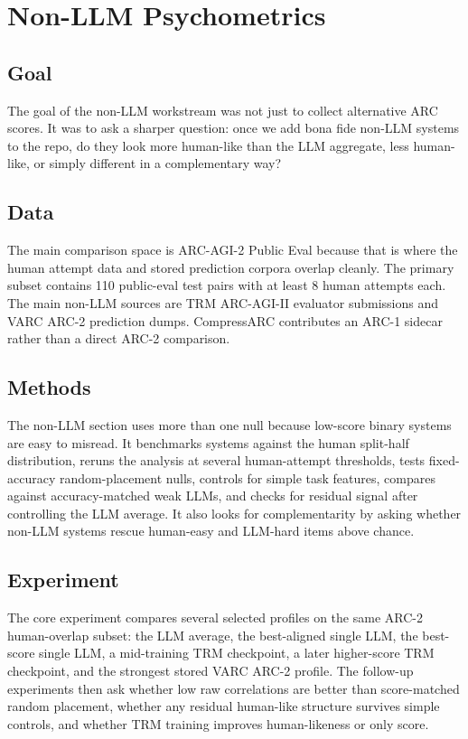 \section{Non-LLM Psychometrics}

\subsection{Goal}

The goal of the non-LLM workstream was not just to collect alternative ARC scores. It was to ask a sharper question: once we add bona fide non-LLM systems to the repo, do they look more human-like than the LLM aggregate, less human-like, or simply different in a complementary way?

\subsection{Data}

The main comparison space is ARC-AGI-2 Public Eval because that is where the human attempt data and stored prediction corpora overlap cleanly. The primary subset contains 110 public-eval test pairs with at least 8 human attempts each. The main non-LLM sources are TRM ARC-AGI-II evaluator submissions and VARC ARC-2 prediction dumps. CompressARC contributes an ARC-1 sidecar rather than a direct ARC-2 comparison.

\subsection{Methods}

The non-LLM section uses more than one null because low-score binary systems are easy to misread. It benchmarks systems against the human split-half distribution, reruns the analysis at several human-attempt thresholds, tests fixed-accuracy random-placement nulls, controls for simple task features, compares against accuracy-matched weak LLMs, and checks for residual signal after controlling the LLM average. It also looks for complementarity by asking whether non-LLM systems rescue human-easy and LLM-hard items above chance.

\subsection{Experiment}

The core experiment compares several selected profiles on the same ARC-2 human-overlap subset: the LLM average, the best-aligned single LLM, the best-score single LLM, a mid-training TRM checkpoint, a later higher-score TRM checkpoint, and the strongest stored VARC ARC-2 profile. The follow-up experiments then ask whether low raw correlations are better than score-matched random placement, whether any residual human-like structure survives simple controls, and whether TRM training improves human-likeness or only score.

